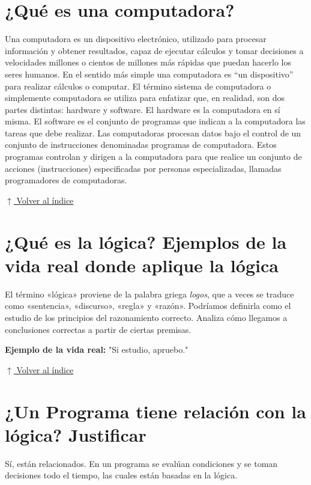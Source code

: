 \documentclass[12pt]{article}
\newcommand{\volverindice}{%
    \vspace{1em}%
    \begin{flushright}%
        \hyperlink{indice}{\small $\uparrow$ Volver al índice}%
    \end{flushright}%
}
\begin{document}
\section{¿Qué es una computadora?}

Una computadora es un dispositivo electrónico, utilizado para procesar información y obtener resultados, capaz de ejecutar cálculos y tomar decisiones a velocidades millones o cientos de millones más rápidas que puedan hacerlo los seres humanos. En el sentido más simple una computadora es ``un dispositivo'' para realizar cálculos o computar. El término sistema de computadora o simplemente computadora se utiliza para enfatizar que, en realidad, son dos partes distintas: hardware y software. El hardware es la computadora en sí misma. El software es el conjunto de programas que indican a la computadora las tareas que debe realizar. Las computadoras procesan datos bajo el control de un conjunto de instrucciones denominadas programas de computadora. Estos programas controlan y dirigen a la computadora para que realice un conjunto de acciones (instrucciones) especificadas por personas especializadas, llamadas programadores de computadoras.

\volverindice
\newpage


\section{¿Qué es la lógica? Ejemplos de la vida real donde aplique la lógica}

El término «lógica» proviene de la palabra griega \textit{logos}, que a veces se traduce como «sentencia», «discurso», «regla» y «razón». Podríamos definirla como el estudio de los principios del razonamiento correcto. Analiza cómo llegamos a conclusiones correctas a partir de ciertas premisas.

\textbf{Ejemplo de la vida real:} "Si estudio, apruebo."

\volverindice
\newpage


\section{¿Un Programa tiene relación con la lógica? Justificar}

Sí, están relacionados. En un programa se evalúan condiciones y se toman decisiones todo el tiempo, las cuales están basadas en la lógica.
\end{document}
